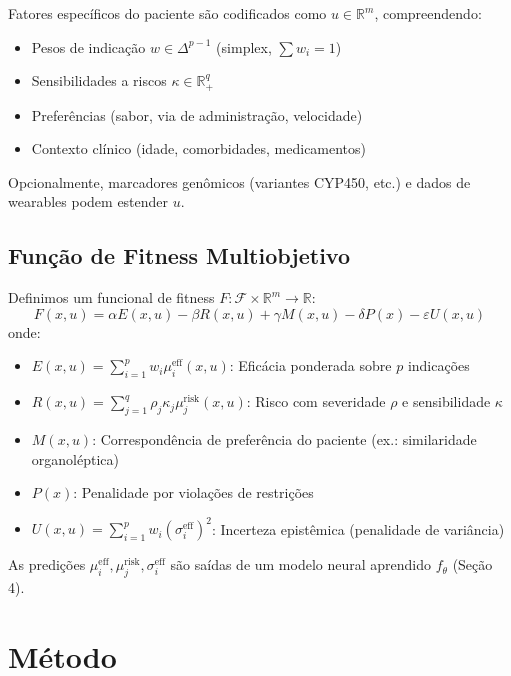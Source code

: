 \documentclass[11pt,a4paper]{article}
\begin{document}
Fatores específicos do paciente são codificados como \(u \in \mathbb{R}^m\), compreendendo:
\begin{itemize}
    \item Pesos de indicação \(w \in \Delta^{p-1}\) (simplex, \(\sum w_i = 1\))
    \item Sensibilidades a riscos \(\kappa \in \mathbb{R}_+^q\)
    \item Preferências (sabor, via de administração, velocidade)
    \item Contexto clínico (idade, comorbidades, medicamentos)
\end{itemize}

Opcionalmente, marcadores genômicos (variantes CYP450, etc.) e dados de wearables podem estender \(u\).

\subsection{Função de Fitness Multiobjetivo}

Definimos um funcional de fitness \(F: \mathcal{F} \times \mathbb{R}^m \to \mathbb{R}\):
\begin{equation}
F(x, u) = \alpha E(x,u) - \beta R(x,u) + \gamma M(x,u) - \delta P(x) - \varepsilon U(x,u)
\end{equation}
onde:
\begin{itemize}
    \item \(E(x,u) = \sum_{i=1}^p w_i \mu_i^{\text{eff}}(x,u)\): Eficácia ponderada sobre \(p\) indicações
    \item \(R(x,u) = \sum_{j=1}^q \rho_j \kappa_j \mu_j^{\text{risk}}(x,u)\): Risco com severidade \(\rho\) e sensibilidade \(\kappa\)
    \item \(M(x,u)\): Correspondência de preferência do paciente (ex.: similaridade organoléptica)
    \item \(P(x)\): Penalidade por violações de restrições
    \item \(U(x,u) = \sum_{i=1}^p w_i (\sigma_i^{\text{eff}})^2\): Incerteza epistêmica (penalidade de variância)
\end{itemize}

As predições \(\mu_i^{\text{eff}}, \mu_j^{\text{risk}}, \sigma_i^{\text{eff}}\) são saídas de um modelo neural aprendido \(f_\theta\) (Seção 4).

\section{Método}
\end{document}
